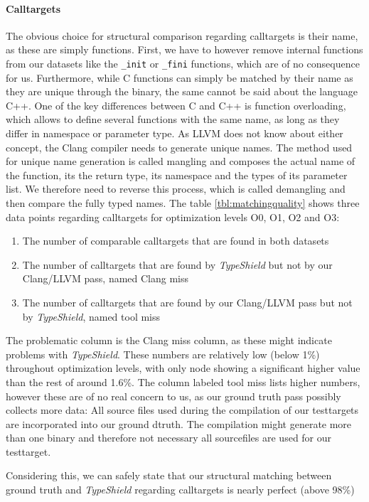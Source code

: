 \paragraph {Calltargets} The obvious choice for structural comparison regarding calltargets is their name, as these are simply functions. First, we have to however remove internal functions from our datasets like the \texttt{\_init} or \texttt{\_fini} functions, which are of no consequence for us. Furthermore, while C functions can simply be matched by their name as they are unique through the binary, the same cannot be said about the language C++. One of the key differences between C and C++ is function overloading, which allows to define several functions with the same name, as long as they differ in namespace or parameter type. As LLVM does not know about either concept, the Clang compiler needs to generate unique names. The method used for unique name generation is called mangling and composes the actual name of the function, its the return type, its namespace and the types of its parameter list. We therefore need to reverse this process, which is called demangling and then compare the fully typed names.
The table \ref{tbl:matchingquality} shows three data points regarding calltargets for optimization levels O0, O1, O2 and O3:
\begin{enumerate}
\item The number of comparable calltargets that are found in both datasets
\item The number of calltargets that are found by \textit{TypeShield} but not by our Clang/LLVM pass, named Clang miss
\item The number of calltargets that are found by our Clang/LLVM pass but not by \textit{TypeShield}, named tool miss
\end{enumerate}
The problematic column is the Clang miss column, as these might indicate problems with \textit{TypeShield}. These numbers are relatively low (below 1\%) throughout optimization levels, with only node showing a significant higher value than the rest of around 1.6\%. The column labeled tool miss lists higher numbers, however these are of no real concern to us, as our ground truth pass possibly collects more data: All source files used during the compilation of our testtargets are incorporated into our ground dtruth. The compilation might generate more than one binary and therefore not necessary all sourcefiles are used for our testtarget.

Considering this, we can safely state that our structural matching between ground truth and \textit{TypeShield} regarding calltargets is nearly perfect (above 98\%)


